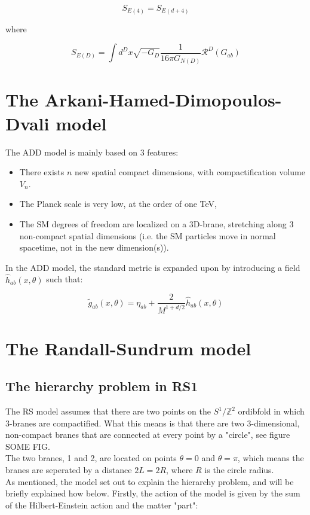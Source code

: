 \documentclass[11pt,a4paper]{article}
\begin{document}
\begin{equation}
	S_{E(4)} = S_{E(d+4)}
\end{equation}

where

\begin{equation}
	S_{E(D)} = \int d^D x\sqrt{-G_D} \frac{1}{16\pi G_{N(D)}}\mathcal{R}^{D}(G_{ab})
\end{equation}

\section{The Arkani-Hamed-Dimopoulos-Dvali model}
The ADD model is mainly based on 3 features:

\begin{itemize}
	\item There exists $n$ new spatial compact dimensions, with compactification volume $V_n$.
	\item The Planck scale is very low, at the order of one TeV,
	\item The SM degrees of freedom are localized on a 3D-brane, stretching along 3 non-compact spatial dimensions (i.e. the SM particles move in normal spacetime, not in the new dimension(s)).
\end{itemize}

In the ADD model, the standard metric is expanded upon by introducing a field $\hat{h}_{ab}(x,\theta)$ such that:

\begin{equation}
	\tilde{g}_{ab}(x,\theta) = \eta_{ab} + \frac{2}{M^{1+d/2}}\hat{h}_{ab}(x,\theta)
\end{equation}



\section{The Randall-Sundrum model}
\subsection{The hierarchy problem in RS1}
The RS model assumes that there are two points on the $S^1/\mathbb{Z}^2$ ordibfold in which 3-branes are compactified. What this means is that there are two 3-dimensional, non-compact branes that are connected at every point by a "circle", see figure SOME FIG.\\



The two branes, 1 and 2, are located on points $\theta = 0$ and $\theta = \pi$, which means the branes are seperated by a distance $2L = 2R$, where $R$ is the circle radius.\\
As mentioned, the model set out to explain the hierarchy problem, and will be briefly explained how below. Firstly, the action of the model is given by the sum of the Hilbert-Einstein action and the matter "part":
\end{document}
